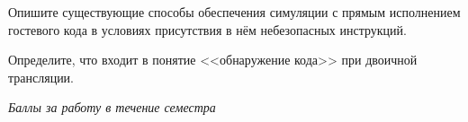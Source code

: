 \documentclass[a4paper, addpoints]{exam}
\begin{document}
\begin{questions}
\question[2] Опишите существующие способы обеспечения симуляции с прямым исполнением гостевого кода в условиях присутствия в нём небезопасных инструкций.
\begin{solution}[2cm]
\end{solution}

\question[2] Определите, что входит в понятие <<обнаружение кода>> при двоичной трансляции.
\begin{solution}[2cm]
\end{solution}



\bonusquestion \textit{Баллы за работу в течение семестра}

\newpage
\phantom{Blank page}

\end{questions}
\end{document}
